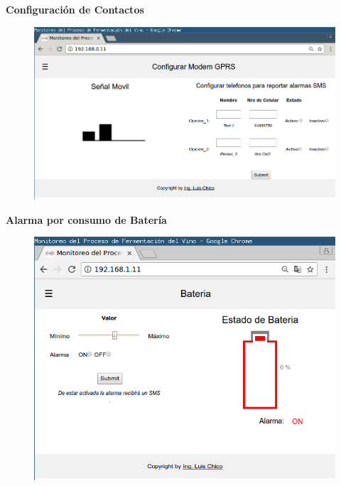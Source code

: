 \documentclass[11pt]{beamer}
\begin{document}
\begin{frame}{\textbf{\LARGE{Configuración de Contactos}}}
  \vspace{-.7cm}
  \begin{figure}[H]
    {\includegraphics[width=1\textwidth]{./imagenes/config_Modem.png}}
  \end{figure}	
\end{frame}

\begin{frame}{\textbf{\LARGE{Alarma por consumo de Batería}}}
  \vspace{-.7cm}
  \begin{figure}[H]
    {\includegraphics[width=1\textwidth]{./imagenes/config_bat.png}}
  \end{figure}	
\end{frame}
\end{document}
